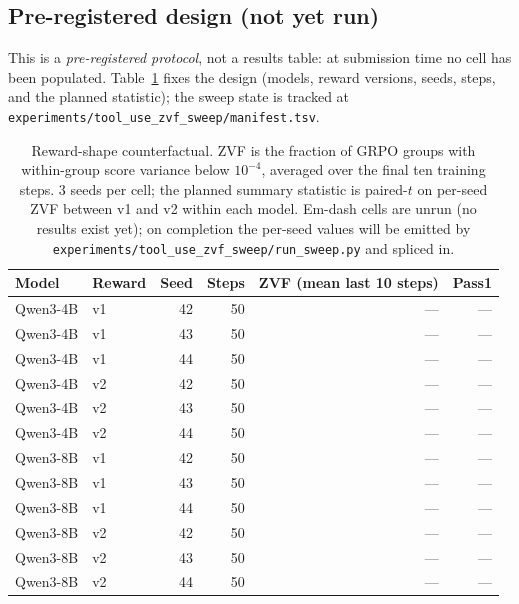 \subsection{Pre-registered design (not yet run)}
This is a \emph{pre-registered protocol}, not a results table: at submission time
no cell has been populated. Table~\ref{tab:zvf_counterfactual} fixes the design
(models, reward versions, seeds, steps, and the planned statistic); the sweep
state is tracked at \texttt{experiments/tool\_use\_zvf\_sweep/manifest.tsv}.

\begin{table}[h]
\centering
\small
\begin{tabular}{llrrrr}
\toprule
Model & Reward & Seed & Steps & ZVF (mean last 10 steps) & Pass\@1 \\
\midrule
Qwen3-4B & v1 & 42 & 50 & --- & --- \\
Qwen3-4B & v1 & 43 & 50 & --- & --- \\
Qwen3-4B & v1 & 44 & 50 & --- & --- \\
Qwen3-4B & v2 & 42 & 50 & --- & --- \\
Qwen3-4B & v2 & 43 & 50 & --- & --- \\
Qwen3-4B & v2 & 44 & 50 & --- & --- \\
\midrule
Qwen3-8B & v1 & 42 & 50 & --- & --- \\
Qwen3-8B & v1 & 43 & 50 & --- & --- \\
Qwen3-8B & v1 & 44 & 50 & --- & --- \\
Qwen3-8B & v2 & 42 & 50 & --- & --- \\
Qwen3-8B & v2 & 43 & 50 & --- & --- \\
Qwen3-8B & v2 & 44 & 50 & --- & --- \\
\bottomrule
\end{tabular}
\caption{Reward-shape counterfactual. ZVF is the fraction of GRPO groups
with within-group score variance below \(10^{-4}\), averaged over the final
ten training steps. \(3\) seeds per cell; the planned summary statistic is
paired-\(t\) on per-seed ZVF between v1 and v2 within each model. Em-dash
cells are unrun (no results exist yet); on completion the per-seed values will be
emitted by \texttt{experiments/tool\_use\_zvf\_sweep/run\_sweep.py} and spliced
in.}
\label{tab:zvf_counterfactual}
\end{table}

